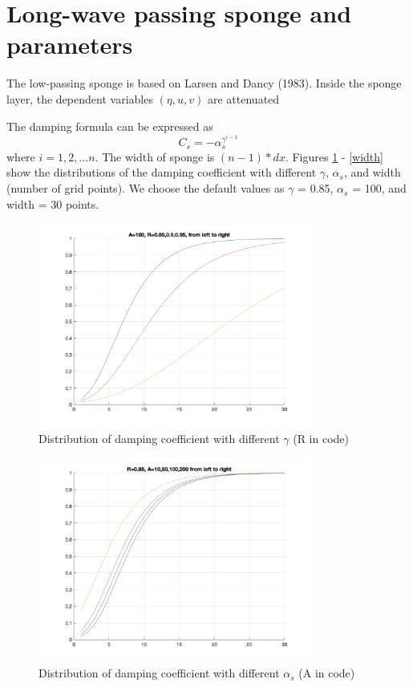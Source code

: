 \documentclass[preprint,10pt]{elsarticle}
\newcommand{\be}{\begin{equation}}
\newcommand{\ee}{\end{equation}}
\begin{document}
\section{Long-wave passing sponge and parameters}

The low-passing sponge is based on Larsen and Dancy (1983). Inside the sponge layer, the dependent variables $(\eta, u, v)$ are attenuated 

The damping formula can be expressed as
\be
C_s = -\alpha_s^{\gamma^{i-1}}
\ee
where $i = 1, 2, ... n$. The width of sponge is $(n-1)*dx$.  Figures \ref{R} - \ref{width} show the distributions of the damping coefficient with different $\gamma$,  $\alpha_s$, and width (number of grid points). We choose the default values as   $\gamma$ = 0.85, $\alpha_s$ = 100, and width = 30 points. 

 \begin{figure}
\begin{center}
 \includegraphics[width=0.8\textwidth]{figures/test_sponge_R.jpg}
 \caption{Distribution of damping coefficient with different $\gamma$ (R in code) }
 \label{R}
 \end{center}
 \end{figure}  

 \begin{figure}
\begin{center}
 \includegraphics[width=0.8\textwidth]{figures/test_sponge_A.jpg}
 \caption{Distribution of damping coefficient with different $\alpha_s$ (A in code) }
 \label{A}
 \end{center}
 \end{figure}  
 
\end{document}
